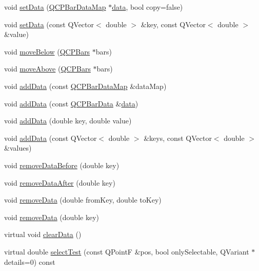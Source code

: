 \begin{DoxyCompactItemize}
\item 
void \hyperlink{classQCPBars_aa3435aab19e0a49e4e7b41bd36a8d96b}{set\+Data} (\hyperlink{qcustomplot_8h_aa846c77472cae93def9f1609d0c57191}{Q\+C\+P\+Bar\+Data\+Map} $\ast$\hyperlink{classQCPBars_ac05c21de37f677545d06fd852ef8a743}{data}, bool copy=false)
\item 
void \hyperlink{classQCPBars_a3efded5df4a82ecb201f7c28099fa2e5}{set\+Data} (const Q\+Vector$<$ double $>$ \&key, const Q\+Vector$<$ double $>$ \&value)
\item 
void \hyperlink{classQCPBars_a69fc371346980f19177c3d1ecdad78ee}{move\+Below} (\hyperlink{classQCPBars}{Q\+C\+P\+Bars} $\ast$bars)
\item 
void \hyperlink{classQCPBars_ac22e00a6a41509538c21b04f0a57318c}{move\+Above} (\hyperlink{classQCPBars}{Q\+C\+P\+Bars} $\ast$bars)
\item 
void \hyperlink{classQCPBars_a1f29cf08615040993209147fa68de3f2}{add\+Data} (const \hyperlink{qcustomplot_8h_aa846c77472cae93def9f1609d0c57191}{Q\+C\+P\+Bar\+Data\+Map} \&data\+Map)
\item 
void \hyperlink{classQCPBars_a142158b1addefd53259002dd3ab22c3a}{add\+Data} (const \hyperlink{classQCPBarData}{Q\+C\+P\+Bar\+Data} \&\hyperlink{classQCPBars_ac05c21de37f677545d06fd852ef8a743}{data})
\item 
void \hyperlink{classQCPBars_a684dd105403a5497fda42f2094fecbb7}{add\+Data} (double key, double value)
\item 
void \hyperlink{classQCPBars_a3679a0a9decab0fa03f8f4c6e3344d52}{add\+Data} (const Q\+Vector$<$ double $>$ \&keys, const Q\+Vector$<$ double $>$ \&values)
\item 
void \hyperlink{classQCPBars_a9d12779a3fad4820aad2c428f368298d}{remove\+Data\+Before} (double key)
\item 
void \hyperlink{classQCPBars_a99de6e7abbbf03fb41fa604c7f08aa8b}{remove\+Data\+After} (double key)
\item 
void \hyperlink{classQCPBars_a1fe9bcb57d670defea1bb65cadf43765}{remove\+Data} (double from\+Key, double to\+Key)
\item 
void \hyperlink{classQCPBars_a837cc9848ad3edd40a6130b508493f93}{remove\+Data} (double key)
\item 
virtual void \hyperlink{classQCPBars_a11dbbd707132f07f862dff13c5789c2b}{clear\+Data} ()
\item 
virtual double \hyperlink{classQCPBars_a0d37a9feb1d0baf73ce6e809db214445}{select\+Test} (const Q\+PointF \&pos, bool only\+Selectable, Q\+Variant $\ast$details=0) const 
\end{DoxyCompactItemize}

